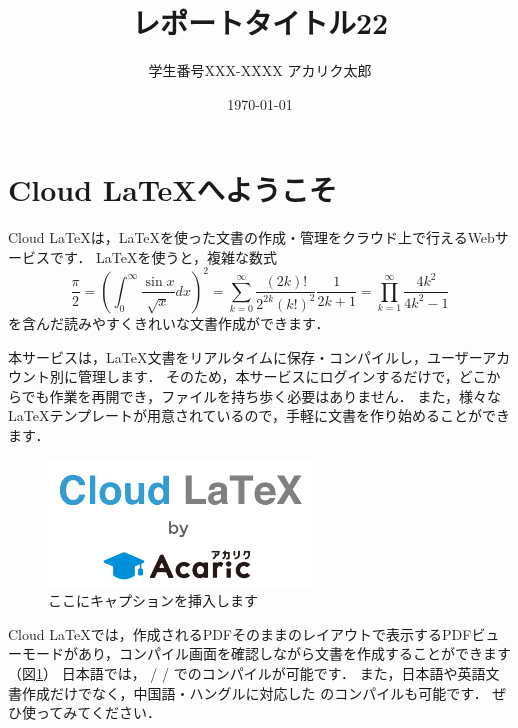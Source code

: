 \documentclass[platex,dvipdfmx]{jlreq}			%
\title{レポートタイトル22}
\author{学生番号XXX-XXXX アカリク太郎}
\date{\today}
\begin{document}
\maketitle
\section{Cloud LaTeXへようこそ}

Cloud LaTeXは，\LaTeX を使った文書の作成・管理をクラウド上で行えるWebサービスです．
\LaTeX を使うと，複雑な数式
\begin{equation}
\frac{\pi}{2} =
\left( \int_{0}^{\infty} \frac{\sin x}{\sqrt{x}} dx \right)^2 =
\sum_{k=0}^{\infty} \frac{(2k)!}{2^{2k}(k!)^2} \frac{1}{2k+1} =
\prod_{k=1}^{\infty} \frac{4k^2}{4k^2 - 1}
\end{equation}
を含んだ読みやすくきれいな文書作成ができます．

本サービスは，\LaTeX 文書をリアルタイムに保存・コンパイルし，ユーザーアカウント別に管理します．
そのため，本サービスにログインするだけで，どこからでも作業を再開でき，ファイルを持ち歩く必要はありません．
また，様々な \LaTeX テンプレートが用意されているので，手軽に文書を作り始めることができます．
\begin{figure}
\centering
\includegraphics[width=70mm]{figures/Sample.png}
\caption{ここにキャプションを挿入します}
\label{fig:model}
\end{figure}

Cloud LaTeXでは，作成されるPDFそのままのレイアウトで表示するPDFビューモードがあり，コンパイル画面を確認しながら文書を作成することができます（図\ref{fig:model}）
日本語では， \pLaTeX / \upLaTeX / \LuaLaTeX でのコンパイルが可能です．
また，日本語や英語文書作成だけでなく，中国語・ハングルに対応した \XeLaTeX のコンパイルも可能です．
ぜひ使ってみてください．
\end{document}
